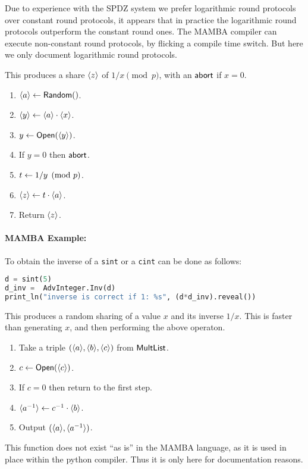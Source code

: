 Due to experience with the SPDZ system we prefer logarithmic
round protocols over constant round protocols, it appears that in
practice the logarithmic round protocols outperform the constant
round ones.
The MAMBA compiler can execute non-constant round protocols, by
flicking a compile time switch. But here we only document
logarithmic round protocols.


This produces a share $\langle z \rangle$ of $1/x \pmod{p}$, with an
$\mathsf{abort}$ if $x=0$.
\begin{enumerate}
  \item $\langle a \rangle \leftarrow \mathsf{Random}()$.
  \item $\langle y \rangle \leftarrow \langle a \rangle \cdot \langle x \rangle$.
  \item $y \leftarrow {\mathsf{Open}}(\langle y \rangle)$.
  \item If $y=0$ then $\mathsf{abort}$.
  \item $t \leftarrow 1/y \pmod{p}$.
  \item $\langle z \rangle \leftarrow t \cdot \langle a \rangle$.
  \item Return $\langle z \rangle$.
\end{enumerate}
\paragraph{MAMBA Example:} To obtain the inverse of a \verb|sint| or a \verb|cint| can be done as follows:
\begin{lstlisting}[language={python}]
d = sint(5)
d_inv =  AdvInteger.Inv(d)
print_ln("inverse is correct if 1: %s", (d*d_inv).reveal())
\end{lstlisting}

This produces a random sharing of a value $x$ and its inverse $1/x$.
This is faster than generating $x$, and then performing the above operaton.
\begin{enumerate}
  \item Take a triple $(\langle a \rangle,\langle b \rangle,\langle c \rangle)$ from $\mathsf{MultList}$.
  \item $c \leftarrow {\mathsf{Open}}(\langle c \rangle)$.
  \item If $c=0$ then return to the first step.
  \item $\langle a^{-1} \rangle \leftarrow c^{-1} \cdot \langle b \rangle$.
  \item Output $(\langle a \rangle,\langle a^{-1} \rangle)$.
\end{enumerate}
This function does not exist ``as is'' in the MAMBA language, as it
is used in place within the python compiler. Thus it is only here
for documentation reasons.

